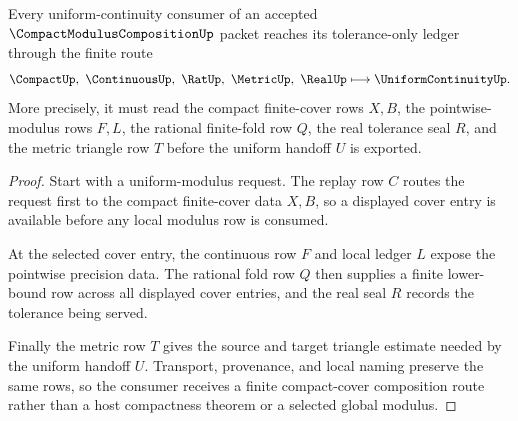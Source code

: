 \begin{theorem}
\label{thm:compact-modulus-composition-uniform-route}
Every uniform-continuity consumer of an accepted $\CompactModulusCompositionUp$ packet reaches its tolerance-only ledger through the finite route
$$
\CompactUp,\ \ContinuousUp,\ \RatUp,\ \MetricUp,\ \RealUp
\longmapsto
\UniformContinuityUp .
$$
More precisely, it must read the compact finite-cover rows $X,B$, the pointwise-modulus rows $F,L$, the rational finite-fold row $Q$, the real tolerance seal $R$, and the metric triangle row $T$ before the uniform handoff $U$ is exported.
\end{theorem}
\begin{proof}
Start with a uniform-modulus request. The replay row $C$ routes the request first to the compact finite-cover data $X,B$, so a displayed cover entry is available before any local modulus row is consumed.

At the selected cover entry, the continuous row $F$ and local ledger $L$ expose the pointwise precision data. The rational fold row $Q$ then supplies a finite lower-bound row across all displayed cover entries, and the real seal $R$ records the tolerance being served.

Finally the metric row $T$ gives the source and target triangle estimate needed by the uniform handoff $U$. Transport, provenance, and local naming preserve the same rows, so the consumer receives a finite compact-cover composition route rather than a host compactness theorem or a selected global modulus.
\end{proof}




